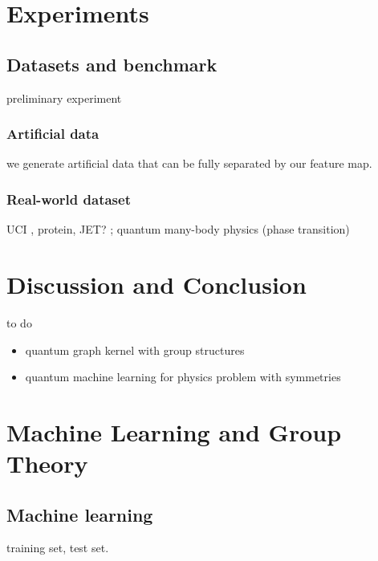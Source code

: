 \section{Experiments}\label{sec:experiments}

\subsection{Datasets and benchmark}
preliminary experiment

\subsubsection{Artificial data}
we generate artificial data that can be fully separated by our feature map.

\subsubsection{Real-world dataset}
UCI \cite{kondorDiffusionKernelsGraphs2002}, protein, JET? \cite{bogatskiyLorentzGroupEquivariant2020}; 
quantum many-body physics (phase transition)
\cite{carrasquillaMachineLearningPhases2017} 

\section{Discussion and Conclusion}\label{sec:discussion}
to do 
\begin{itemize}
	\item quantum graph kernel with group structures
	\item quantum machine learning for physics problem with symmetries
\end{itemize}

\printbibliography
\appendix

\section{Machine Learning and Group Theory}
\subsection{Machine learning}
training set, test set.

